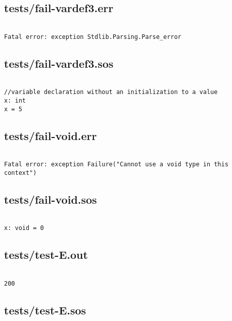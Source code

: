 \documentclass[main.tex]{subfiles}
\begin{document}
\subsection{tests/fail-vardef3.err}

\begin{lstlisting}

Fatal error: exception Stdlib.Parsing.Parse_error
\end{lstlisting}

\subsection{tests/fail-vardef3.sos}

\begin{lstlisting}

//variable declaration without an initialization to a value
x: int
x = 5
\end{lstlisting}

\subsection{tests/fail-void.err}

\begin{lstlisting}

Fatal error: exception Failure("Cannot use a void type in this context")
\end{lstlisting}

\subsection{tests/fail-void.sos}

\begin{lstlisting}

x: void = 0
\end{lstlisting}

\subsection{tests/test-E.out}

\begin{lstlisting}

200
\end{lstlisting}

\subsection{tests/test-E.sos}
\end{document}
